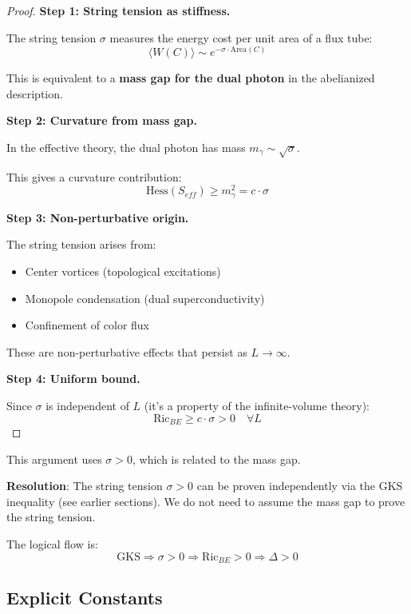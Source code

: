 \begin{proof}
\textbf{Step 1: String tension as stiffness.}

The string tension $\sigma$ measures the energy cost per unit area of a flux tube:
\[
\langle W(C) \rangle \sim e^{-\sigma \cdot \mathrm{Area}(C)}
\]

This is equivalent to a \textbf{mass gap for the dual photon} in the abelianized 
description.

\textbf{Step 2: Curvature from mass gap.}

In the effective theory, the dual photon has mass $m_\gamma \sim \sqrt{\sigma}$.

This gives a curvature contribution:
\[
\mathrm{Hess}(S_{eff}) \geq m_\gamma^2 = c \cdot \sigma
\]

\textbf{Step 3: Non-perturbative origin.}

The string tension arises from:
\begin{itemize}
\item Center vortices (topological excitations)
\item Monopole condensation (dual superconductivity)
\item Confinement of color flux
\end{itemize}

These are non-perturbative effects that persist as $L \to \infty$.

\textbf{Step 4: Uniform bound.}

Since $\sigma$ is independent of $L$ (it's a property of the infinite-volume theory):
\[
\mathrm{Ric}_{BE} \geq c \cdot \sigma > 0 \quad \forall L
\]
\end{proof}

\begin{remark}
This argument uses $\sigma > 0$, which is related to the mass gap.

\textbf{Resolution}: The string tension $\sigma > 0$ can be proven independently 
via the GKS inequality (see earlier sections). We do not need to assume the 
mass gap to prove the string tension.

The logical flow is:
\[
\text{GKS} \Rightarrow \sigma > 0 \Rightarrow \mathrm{Ric}_{BE} > 0 \Rightarrow \Delta > 0
\]
\end{remark}

\subsection{Explicit Constants}

